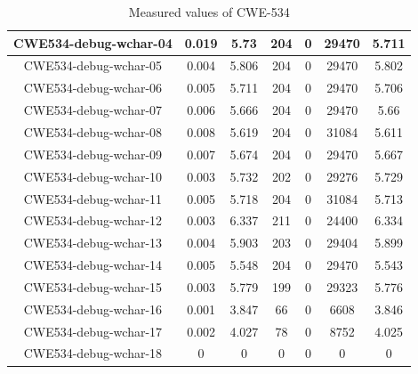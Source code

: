 \begin{table}[h!]
\begin{tabular}{||c |c |c |c |c| c|c||}
 \hline
 CWE534-debug-wchar-04 & 0.019 & 5.73 & 204&0& 29470&5.711 \\ 
 \hline
 CWE534-debug-wchar-05 & 0.004 & 5.806 & 204&0& 29470& 5.802\\ 
 \hline
 CWE534-debug-wchar-06 & 0.005 & 5.711 & 204&0& 29470& 5.706\\ 
 \hline
 CWE534-debug-wchar-07 & 0.006 & 5.666 & 204&0& 29470&5.66 \\ 
 \hline
 CWE534-debug-wchar-08 & 0.008 & 5.619 & 204&0& 31084&5.611 \\ 
 \hline
 CWE534-debug-wchar-09 & 0.007 & 5.674 & 204&0& 29470& 5.667\\ 
 \hline
 CWE534-debug-wchar-10 & 0.003 & 5.732 & 202&0&29276&5.729  \\ 
 \hline
 CWE534-debug-wchar-11 & 0.005 & 5.718 &204&0&31084& 5.713 \\ 
 \hline
 CWE534-debug-wchar-12 & 0.003 &6.337 &211&0& 24400& 6.334\\ 
 \hline
 CWE534-debug-wchar-13 & 0.004 & 5.903 & 203&0& 29404&5.899 \\ 
 \hline
 CWE534-debug-wchar-14 & 0.005 & 5.548 & 204&0& 29470&5.543 \\ 
 \hline
 CWE534-debug-wchar-15 & 0.003 & 5.779 & 199&0&29323&5.776 \\ 
 \hline
  CWE534-debug-wchar-16 & 0.001 & 3.847 & 66&0& 6608&3.846 \\ 
 \hline
  CWE534-debug-wchar-17 & 0.002 & 4.027 & 78&0& 8752&4.025 \\ 
 \hline
  CWE534-debug-wchar-18 & 0 & 0 & 0&0& 0& 0\\
 \hline
 \hline
\end{tabular}
\caption{Measured values of CWE-534}
\label{table:time2}
\end{table}

